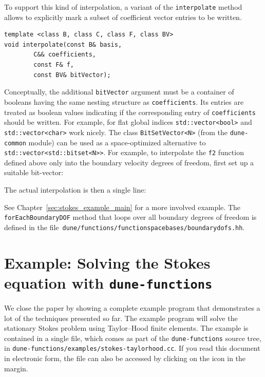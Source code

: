 \documentclass[a4paper,10pt,headings=normal,bibliography=totoc]{scrartcl}
\newcommand{\cpp}[1]{\lstinline[basicstyle=\ttfamily]!#1!}
\newcommand{\dunemodule}[1]{\texttt{#1}}
\newcommand{\file}[1]{\texttt{#1}}
\begin{document}
To support this kind of interpolation, a variant of the
\cpp{interpolate} method allows to explicitly mark a subset of
coefficient vector entries to be written.
\begin{lstlisting}[style=Interface]
template <class B, class C, class F, class BV>
void interpolate(const B& basis,
        C&& coefficients,
        const F& f,
        const BV& bitVector);
\end{lstlisting}
Conceptually, the additional \cpp{bitVector}
argument must be a container of booleans having
the same nesting structure as \cpp{coefficients}.
Its entries are treated as boolean
values indicating if the corresponding entry of \cpp{coefficients}
should be written.
For example, for flat global indices \cpp{std::vector<bool>} and
\cpp{std::vector<char>} work nicely.
The class \cpp{BitSetVector<N>} (from the \dunemodule{dune-common} module) can be used
as a space-optimized alternative to \cpp{std::vector<std::bitset<N>>}.
For example, to interpolate the \cpp{f2} function defined above
only into the boundary velocity degrees of freedom,
first set up a suitable bit-vector:
%

%
The actual interpolation is then a single line:
%

%
See Chapter~\ref{sec:stokes_example_main} for a more involved example.
The \cpp{forEachBoundaryDOF} method that loops over all boundary degrees of freedom
is defined in the file~\file{dune/functions/\allowbreak functionspacebases/boundarydofs.hh}.




\section{Example: Solving the Stokes equation with \dunemodule{dune-functions}}

We close the paper by showing a complete example program that demonstrates a lot
of the techniques presented so far.  The example program will solve the
stationary Stokes problem using Taylor--Hood finite elements.
The example is contained in a single file, which comes as part of the \dunemodule{dune-functions}
source tree, in \file{dune-functions/examples/stokes-taylorhood.cc}.  If you read this document in electronic form,
the file can also be accessed by clicking on the icon in the margin.%
%
\end{document}
